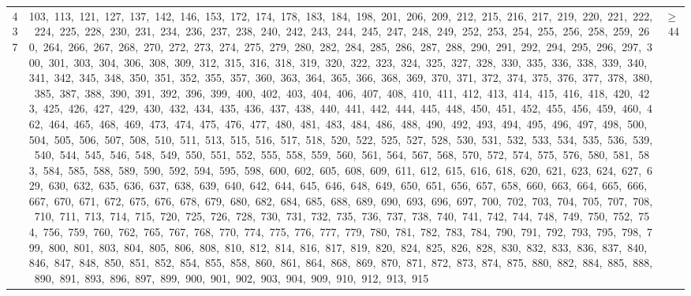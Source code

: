 \begin{longtable}{c|p{}|r}
437 & 103,\ 113,\ 121,\ 127,\ 137,\ 142,\ 146,\ 153,\ 172,\ 174,\ 178,\ 183,\ 184,\ 198,\ 201,\ 206,\ 209,\ 212,\ 215,\ 216,\ 217,\ 219,\ 220,\ 221,\ 222,\ 224,\ 225,\ 228,\ 230,\ 231,\ 234,\ 236,\ 237,\ 238,\ 240,\ 242,\ 243,\ 244,\ 245,\ 247,\ 248,\ 249,\ 252,\ 253,\ 254,\ 255,\ 256,\ 258,\ 259,\ 260,\ 264,\ 266,\ 267,\ 268,\ 270,\ 272,\ 273,\ 274,\ 275,\ 279,\ 280,\ 282,\ 284,\ 285,\ 286,\ 287,\ 288,\ 290,\ 291,\ 292,\ 294,\ 295,\ 296,\ 297,\ 300,\ 301,\ 303,\ 304,\ 306,\ 308,\ 309,\ 312,\ 315,\ 316,\ 318,\ 319,\ 320,\ 322,\ 323,\ 324,\ 325,\ 327,\ 328,\ 330,\ 335,\ 336,\ 338,\ 339,\ 340,\ 341,\ 342,\ 345,\ 348,\ 350,\ 351,\ 352,\ 355,\ 357,\ 360,\ 363,\ 364,\ 365,\ 366,\ 368,\ 369,\ 370,\ 371,\ 372,\ 374,\ 375,\ 376,\ 377,\ 378,\ 380,\ 385,\ 387,\ 388,\ 390,\ 391,\ 392,\ 396,\ 399,\ 400,\ 402,\ 403,\ 404,\ 406,\ 407,\ 408,\ 410,\ 411,\ 412,\ 413,\ 414,\ 415,\ 416,\ 418,\ 420,\ 423,\ 425,\ 426,\ 427,\ 429,\ 430,\ 432,\ 434,\ 435,\ 436,\ 437,\ 438,\ 440,\ 441,\ 442,\ 444,\ 445,\ 448,\ 450,\ 451,\ 452,\ 455,\ 456,\ 459,\ 460,\ 462,\ 464,\ 465,\ 468,\ 469,\ 473,\ 474,\ 475,\ 476,\ 477,\ 480,\ 481,\ 483,\ 484,\ 486,\ 488,\ 490,\ 492,\ 493,\ 494,\ 495,\ 496,\ 497,\ 498,\ 500,\ 504,\ 505,\ 506,\ 507,\ 508,\ 510,\ 511,\ 513,\ 515,\ 516,\ 517,\ 518,\ 520,\ 522,\ 525,\ 527,\ 528,\ 530,\ 531,\ 532,\ 533,\ 534,\ 535,\ 536,\ 539,\ 540,\ 544,\ 545,\ 546,\ 548,\ 549,\ 550,\ 551,\ 552,\ 555,\ 558,\ 559,\ 560,\ 561,\ 564,\ 567,\ 568,\ 570,\ 572,\ 574,\ 575,\ 576,\ 580,\ 581,\ 583,\ 584,\ 585,\ 588,\ 589,\ 590,\ 592,\ 594,\ 595,\ 598,\ 600,\ 602,\ 605,\ 608,\ 609,\ 611,\ 612,\ 615,\ 616,\ 618,\ 620,\ 621,\ 623,\ 624,\ 627,\ 629,\ 630,\ 632,\ 635,\ 636,\ 637,\ 638,\ 639,\ 640,\ 642,\ 644,\ 645,\ 646,\ 648,\ 649,\ 650,\ 651,\ 656,\ 657,\ 658,\ 660,\ 663,\ 664,\ 665,\ 666,\ 667,\ 670,\ 671,\ 672,\ 675,\ 676,\ 678,\ 679,\ 680,\ 682,\ 684,\ 685,\ 688,\ 689,\ 690,\ 693,\ 696,\ 697,\ 700,\ 702,\ 703,\ 704,\ 705,\ 707,\ 708,\ 710,\ 711,\ 713,\ 714,\ 715,\ 720,\ 725,\ 726,\ 728,\ 730,\ 731,\ 732,\ 735,\ 736,\ 737,\ 738,\ 740,\ 741,\ 742,\ 744,\ 748,\ 749,\ 750,\ 752,\ 754,\ 756,\ 759,\ 760,\ 762,\ 765,\ 767,\ 768,\ 770,\ 774,\ 775,\ 776,\ 777,\ 779,\ 780,\ 781,\ 782,\ 783,\ 784,\ 790,\ 791,\ 792,\ 793,\ 795,\ 798,\ 799,\ 800,\ 801,\ 803,\ 804,\ 805,\ 806,\ 808,\ 810,\ 812,\ 814,\ 816,\ 817,\ 819,\ 820,\ 824,\ 825,\ 826,\ 828,\ 830,\ 832,\ 833,\ 836,\ 837,\ 840,\ 846,\ 847,\ 848,\ 850,\ 851,\ 852,\ 854,\ 855,\ 858,\ 860,\ 861,\ 864,\ 868,\ 869,\ 870,\ 871,\ 872,\ 873,\ 874,\ 875,\ 880,\ 882,\ 884,\ 885,\ 888,\ 890,\ 891,\ 893,\ 896,\ 897,\ 899,\ 900,\ 901,\ 902,\ 903,\ 904,\ 909,\ 910,\ 912,\ 913,\ 915 & $\ge$ 44 \\

\end{longtable}

